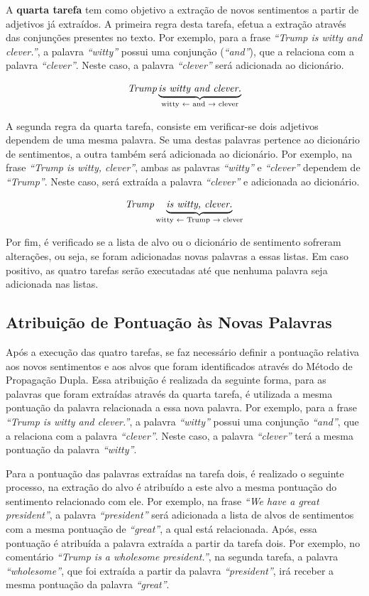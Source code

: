 A \textbf{quarta tarefa} tem como objetivo a extração de novos sentimentos a
partir de adjetivos já extraídos. A primeira regra desta tarefa, efetua a extração através
das conjunções presentes no texto. Por exemplo, para a frase \textit{``Trump is
witty and clever.''}, a palavra \textit{``witty''} possui uma conjunção
(\textit{``and''}), que a relaciona com a palavra \textit{``clever''}. Neste
caso, a palavra \textit{``clever''} será adicionada ao dicionário.

\[\textit{Trump} \underbrace{\textit{is witty and clever.}}_\text{witty
\textleftarrow \text{ and} \textrightarrow \text{ clever}}\]


A segunda regra da quarta tarefa, consiste em verificar-se dois adjetivos
dependem de uma mesma palavra. Se uma destas palavras pertence ao dicionário de
sentimentos, a outra também será adicionada ao dicionário. Por exemplo, na frase
\textit{``Trump is witty, clever''}, ambas as palavras \textit{``witty''} e
\textit{``clever''} dependem de \textit{``Trump''}. Neste caso, será extraída a
palavra \textit{``clever''} e adicionada ao dicionário.

\[\textit{Trump} \underbrace{\textit{is witty, clever.}}_\text{witty
\textleftarrow \text{ Trump} \textrightarrow \text{ clever}}\]

Por fim, é verificado se a lista de alvo ou o dicionário de sentimento sofreram
alterações, ou seja, se foram adicionadas novas palavras a essas listas. Em caso
positivo, as quatro tarefas serão executadas até que nenhuma palavra seja
adicionada nas listas.

\subsection{Atribuição de Pontuação às Novas Palavras}

Após a execução das quatro tarefas, se faz necessário definir a
pontuação relativa aos novos sentimentos e aos alvos que foram identificados
através do Método de Propagação Dupla. Essa atribuição é realizada da seguinte forma,
para as palavras que foram extraídas através da quarta tarefa, é utilizada a
mesma pontuação da palavra relacionada a essa nova palavra. Por exemplo, para a frase \textit{``Trump is
witty and clever.''}, a palavra \textit{``witty''} possui uma conjunção
\textit{``and''}, que a relaciona com a palavra \textit{``clever''}. Neste
caso, a palavra \textit{``clever''} terá a mesma pontuação da palavra
\textit{``witty''}.

Para a pontuação das palavras extraídas na tarefa dois, é realizado o seguinte
processo, na extração do alvo é atribuído a este alvo a mesma pontuação do
sentimento relacionado com ele. Por exemplo, na frase \textit{``We have a great
president''}, a palavra \textit{``president''} será adicionada a lista de alvos
de sentimentos com a mesma pontuação de \textit{``great''}, a qual está
relacionada. Após, essa pontuação é atribuída a palavra extraída a partir
da tarefa dois.
Por exemplo, no comentário \textit{``Trump is a wholesome president.''}, na
segunda tarefa, a palavra \textit{``wholesome''}, que foi extraída a partir da
palavra \textit{``president''}, irá receber a mesma pontuação da palavra
\textit{``great''}.

